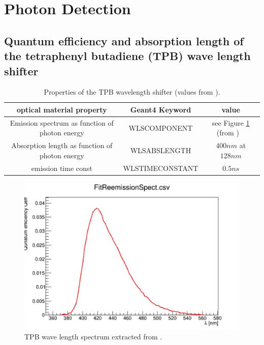\documentclass[a4paper]{jpconf}
\begin{document}
  
  \clearpage
  \section{Photon Detection}
\subsection{Quantum efficiency and absorption length of the tetraphenyl butadiene (TPB) wave length shifter}
\cite{ref:wls}
\begin{table}[h!]
  \begin{center}
    \label{tab:wls}
    \begin{tabular}{|c|c|c|} 
      \hline
      \textbf{optical material property} &\textbf{ Geant4 Keyword} & \textbf{value}\\
      \hline
      Emission spectrum as function of photon energy & WLSCOMPONENT & see Figure \ref{fig:wls} (from  \cite{ref:wls}) \ \\
      Absorption length as function of photon energy & WLSABSLENGTH & $400 nm$ at $128 nm$ \\
      emission time const                           &  WLSTIMECONSTANT        & $0.5 ns$  \\
      \hline
    \end{tabular}
  \end{center}
  \caption{Properties of the TPB wavelength shifter (values from \cite{ref:wls}).}
 \end{table}


\begin{figure}[ht]
\begin{center}
\includegraphics[width=35.5pc]{wls.pdf}
\end{center}
\caption{\label{fig:wls} TPB wave length spectrum extracted from \cite{ref:wls}.}
\end{figure}
\end{document}
